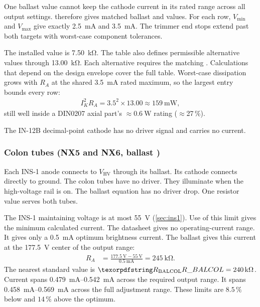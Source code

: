 One ballast value cannot keep the cathode current in its rated range across all
output settings.  therefore gives matched ballast
and  values. For each row, $V_{\mathrm{min}}$ and
$V_{\mathrm{max}}$ give exactly \SI{2.5}{\milli\ampere} and
\SI{3.5}{\milli\ampere}. The trimmer end stops extend past both targets with
worst-case component tolerances.

The installed  value is \SI{7.50}{\kilo\ohm}. The table also
defines permissible alternative values through \SI{13.00}{\kilo\ohm}. Each
alternative requires the matching . Calculations that depend on the
design envelope cover the full table. Worst-case dissipation grows with $R_A$ at the shared
\SI{3.5}{\milli\ampere} rated maximum, so the largest entry bounds every row:
\begin{align*}
  I_K^2 R_A = 3.5^2 \times 13.00 \approx \SI{159}{\milli\watt},
\end{align*}
still well inside a DIN0207 axial part's $\approx\SI{0.6}{\watt}$ rating
($\approx$27\,\%).

The IN-12B decimal-point cathode has no driver signal and carries no current.

\subsubsection{Colon tubes (NX5 and NX6, ballast )}\label{sec:hv-load-colon}

Each INS-1 anode connects to $V_{\mathrm{HV}}$ through its ballast. Its cathode
connects directly to ground. The colon tubes have no driver. They illuminate
when the high-voltage rail is on. The ballast equation has no driver drop. One
resistor value serves both tubes.

The INS-1 maintaining voltage is at most \SI{55}{\volt}
(\cref{sec:ins1}). Use of this limit gives the minimum calculated current. The
datasheet gives no operating-current range. It gives only a
\SI{0.5}{\milli\ampere} optimum brightness current. The ballast gives this
current at the \SI{177.5}{\volt} center of the output range:
\begin{align*}
  R_A &= \frac{\SI{177.5}{\volt} - \SI{55}{\volt}}{\SI{0.5}{\milli\ampere}}
       = \SI{245}{\kilo\ohm}.
\end{align*}
The nearest standard value is $\des{R}{BALCOL} = \SI{240}{\kilo\ohm}$. Current
spans \SIrange{0.479}{0.542}{\milli\ampere} across the required output range.
It spans \SIrange{0.458}{0.569}{\milli\ampere} across the full adjustment
range. These limits are $8.5\,\%$ below and $14\,\%$ above the optimum.


